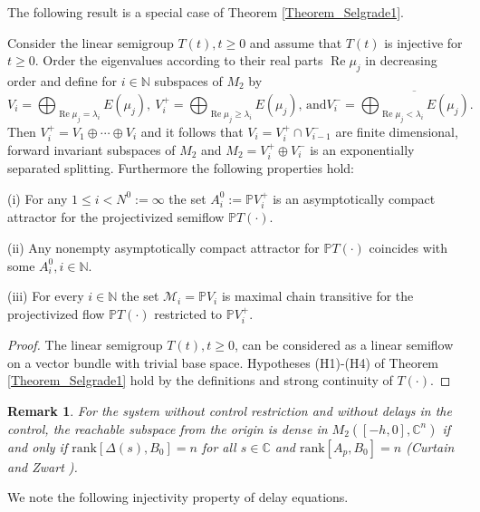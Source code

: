 \documentclass{siamltex}%
\newtheorem{remark}[theorem]{Remark}
\begin{document}
The following result is a special case of Theorem \ref{Theorem_Selgrade1}.

\begin{theorem}
\label{Theorem_Selgrade_hom}Consider the linear semigroup $T(t),t\geq0$ and
assume that $T(t)$ is injective for $t\geq0$. Order the eigenvalues according
to their real parts $\operatorname{Re}\mu_{j}$ in decreasing order and define
for $i\in\mathbb{N}$ subspaces of $M_{2}$ by%
\[
V_{i}=\bigoplus_{\operatorname{Re}\mu_{j}=\lambda_{i}}E(\mu_{j}),~V_{i}%
^{+}=\bigoplus_{\operatorname{Re}\mu_{j}\geq\lambda_{i}}E(\mu_{j})\text{, and
}V_{i}^{-}=\overline{\bigoplus_{\operatorname{Re}\mu_{j}<\lambda_{i}}E(\mu
_{j})}.
\]
Then $V_{i}^{+}=V_{1}\oplus\cdots\oplus V_{i}$ and it follows that
$V_{i}=V_{i}^{+}\cap V_{i-1}^{-}$ are finite dimensional, forward invariant
subspaces of $M_{2}$ and $M_{2}=V_{i}^{+}\oplus V_{i}^{-}$ is an exponentially
separated splitting. Furthermore the following properties hold:

(i) For any $1\leq i<N^{0}:=\infty$ the set $A_{i}^{0}:=\mathbb{P}V_{i}^{+}$
is an asymptotically compact attractor for the projectivized semiflow
$\mathbb{P}T(\cdot)$.

(ii) Any nonempty asymptotically compact attractor for $\mathbb{P}T(\cdot)$
coincides with some $A_{i}^{0},i\in\mathbb{N}.$

(iii) For every $i\in\mathbb{N}$ the set $\mathcal{M}_{i}=\mathbb{P}V_{i}$ is
maximal chain transitive for the projectivized flow $\mathbb{P}T(\cdot)$
restricted to $\mathbb{P}V_{i}^{+}$.
\end{theorem}

\begin{proof}
The linear semigroup $T(t),t\geq0$, can be considered as a linear semiflow on
a vector bundle with trivial base space. Hypotheses (H1)-(H4) of Theorem
\ref{Theorem_Selgrade1} hold by the definitions and strong continuity of
$T(\cdot)$.
\end{proof}

\begin{remark}
For the system without control restriction and without delays in the control,
the reachable subspace from the origin is dense in $M_{2}([-h,0],\mathbb{C}%
^{n})$ if and only if $\mathrm{rank}\left[  \Delta(s),B_{0}\right]  =n$ for
all $s\in\mathbb{C}$ and $\mathrm{rank}\left[  A_{p},B_{0}\right]  =n$
(Curtain and Zwart \cite[Theorem 6.3.13]{CurtZ}).
\end{remark}

We note the following injectivity property of delay equations.
\end{document}
